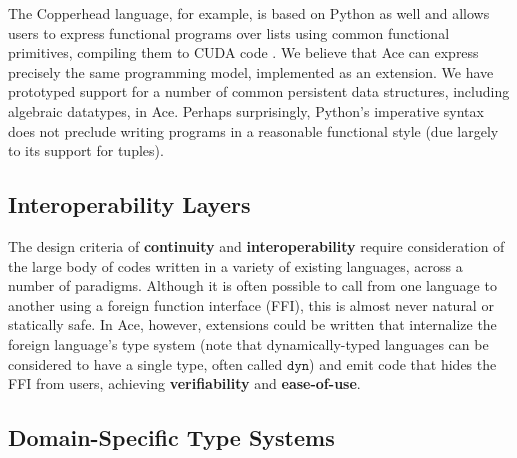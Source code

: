 \documentclass[9pt,preprint]{sigplanconf}
\begin{document}
The Copperhead language, for example, is based on Python as well and allows users to express functional programs over lists using common functional primitives, compiling them to CUDA code \cite{catanzaro2011copperhead}. We believe that Ace can express precisely the same programming model, implemented as an extension. We have prototyped support for a number of common persistent data structures, including algebraic datatypes, in Ace. Perhaps surprisingly, Python's imperative syntax does not preclude writing programs in a reasonable functional style (due largely to its support for tuples).

\subsection{Interoperability Layers}
The design criteria of \textbf{continuity} and \textbf{interoperability} require consideration of the large body of codes written in a variety of existing languages, across a number of paradigms. Although it is often possible to call from one language to another using a foreign function interface (FFI), this is almost never natural or statically safe. In Ace, however, extensions could be written that internalize the foreign language's type system (note that dynamically-typed languages can be considered to have a single type, often called $\mathtt{dyn}$) and emit code that hides the FFI from users, achieving \textbf{verifiability} and \textbf{ease-of-use}.


\subsection{Domain-Specific Type Systems}
\end{document}

